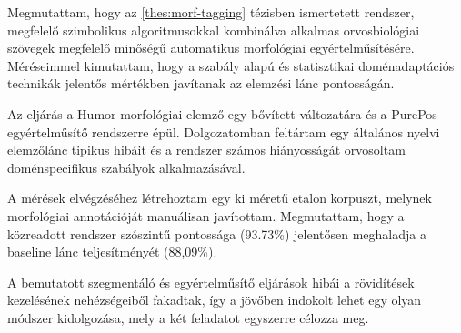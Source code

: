 \thesisline%

\begin{core}
\begin{thesis}%
Megmutattam, hogy az \ref{thes:morf-tagging} tézisben ismertetett rendszer, megfelelő szimbolikus algoritmusokkal kombinálva alkalmas orvosbiológiai szövegek megfelelő minőségű automatikus morfológiai egyértelműsítésére. 
Méréseimmel kimutattam, hogy a szabály alapú és statisztikai doménadaptációs technikák jelentős mértékben javítanak az elemzési lánc pontosságán.
\end{thesis}

\begin{pub}
\cite{Orosz2013,Orosz2014b} 
\end{pub}
\end{core}

Az eljárás a Humor morfológiai elemző egy bővített változatára és a PurePos egyértelműsítő rendszerre épül. 
Dolgozatomban feltártam egy általános nyelvi elemzőlánc tipikus hibáit és a rendszer számos hiányosságát orvosoltam doménspecifikus szabályok alkalmazásával. 

A mérések elvégzéséhez létrehoztam egy ki méretű etalon korpuszt, melynek morfológiai annotációját manuálisan javítottam. 
Megmutattam, hogy a közreadott rendszer szószintű pontossága (93.73\%) jelentősen meghaladja a baseline lánc teljesítményét (88,09\%). 

A bemutatott szegmentáló és egyértelműsítő eljárások hibái a rövidítések kezelésének nehézségeiből fakadtak, így a jövőben indokolt lehet egy olyan módszer kidolgozása, mely a két feladatot egyszerre célozza meg.

\let\thesubsection=\oldthesubsection
